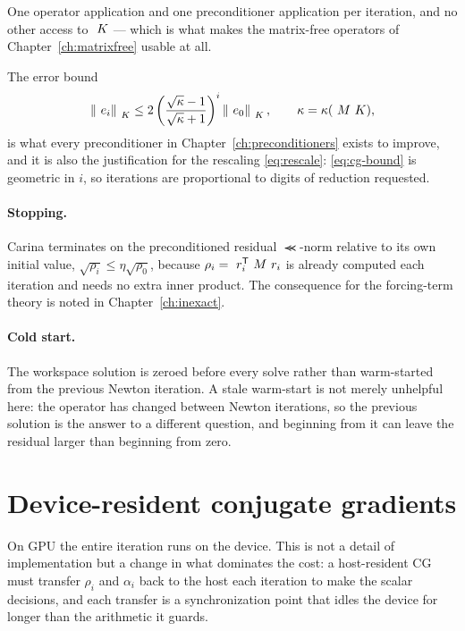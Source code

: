 \noindent One operator application and one preconditioner application per
iteration, and no other access to $~K$ --- which is what makes the
matrix-free operators of Chapter~\ref{ch:matrixfree} usable at all.

The error bound
\begin{equation}
  \left\lVert ~e_i \right\rVert_{~K} \le 2\left(\frac{\sqrt{\kappa}-1}{\sqrt{\kappa}+1}\right)^{i}
                                 \left\lVert ~e_0 \right\rVert_{~K},
  \qquad \kappa = \kappa(~M~K),
  \label{eq:cg-bound}
\end{equation}
is what every preconditioner in Chapter~\ref{ch:preconditioners} exists to
improve, and it is also the justification for the rescaling
\eqref{eq:rescale}: \eqref{eq:cg-bound} is geometric in $i$, so iterations are
proportional to digits of reduction requested.

\paragraph{Stopping.}  Carina terminates on the preconditioned residual
$\Prec$-norm relative to its own initial value, $\sqrt{\rho_i} \le \eta
\sqrt{\rho_0}$, because $\rho_i = ~r_i^{\mathsf{T}}~M~r_i$ is
already computed each iteration and needs no extra inner product.  The
consequence for the forcing-term theory is noted in
Chapter~\ref{ch:inexact}.

\paragraph{Cold start.}  The workspace solution is zeroed before every solve
rather than warm-started from the previous Newton iteration.  A stale
warm-start is not merely unhelpful here: the operator has changed between
Newton iterations, so the previous solution is the answer to a different
question, and beginning from it can leave the residual larger than beginning
from zero.

\section{Device-resident conjugate gradients}
\label{sec:device-cg}

On GPU the entire iteration runs on the device.  This is not a detail of
implementation but a change in what dominates the cost: a host-resident CG must
transfer $\rho_i$ and $\alpha_i$ back to the host each iteration to make the
scalar decisions, and each transfer is a synchronization point that idles the
device for longer than the arithmetic it guards.

